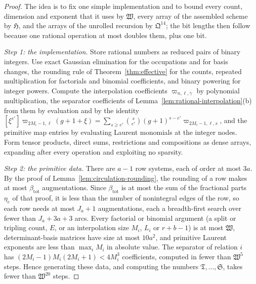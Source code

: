 \begin{proof}
The idea is to fix one simple implementation and to bound every count,
dimension and exponent that it uses by \(\mathfrak W\), every array of
the assembled scheme by \(\mathfrak H\), and the arrays of the unrolled
recursion by \(\mathfrak Q^{14}\); the bit lengths then follow because
one rational operation at most doubles them, plus one bit.

\emph{Step 1: the implementation.} Store rational numbers as reduced
pairs of binary integers. Use exact Gaussian elimination for the
occupations and for basis changes, the rounding rule of
Theorem~\ref{thm:effective} for the counts, repeated multiplication for
factorials and binomial coefficients, and binary powering for integer
powers. Compute the interpolation coefficients
\(\varpi_{n,\ell,\gamma}\) by polynomial multiplication, the separator
coefficients of Lemma~\ref{lem:rational-interpolation}(b) from them by
evaluation and by the identity
\([\xi^{e'}]\varpi_{2M_i-1,\ell}(g+1+\xi)
=\sum_{s\ge e'}\binom s{e'}(g+1)^{s-e'}\varpi_{2M_i-1,\ell,s}\), and the
primitive map entries by evaluating Laurent monomials at the integer
nodes. Form tensor products, direct sums, restrictions and
compositions as dense arrays, expanding after every operation and
exploiting no sparsity.

\emph{Step 2: the primitive data.} There are \(a-1\) row systems, each
of order at most \(3a\). By the proof of
Lemma~\ref{lem:circulation-rounding}, the rounding of a row makes at
most \(\beta_{\mathrm{tot}}\) augmentations. Since
\(\beta_{\mathrm{tot}}\) is at most the sum of the fractional parts
\(\eta_e\) of that proof, it is less than the number of nonintegral
edges of the row, so each row needs at most \(J_a+1\) augmentations,
each a breadth-first search over fewer than \(J_a+3a+3\) arcs. Every
factorial or binomial argument (a split or tripling count, \(E\), or an
interpolation size \(M_i\), \(L_i\) or \(r+b-1\)) is at most
\(\mathfrak W\), determinant-basis matrices have size at most \(10a^2\),
and primitive Laurent exponents are less than \(\max_iM_i\) in absolute
value. The separator of relation \(i\) has
\((2M_i-1)M_i(2M_i+1)<4M_i^3\) coefficients, computed in fewer than
\(\mathfrak W^5\) steps. Hence generating these data, and computing the
numbers \(\mathfrak T,\ldots,\mathfrak S\), takes fewer than
\(\mathfrak W^{20}\) steps.


\end{proof}
